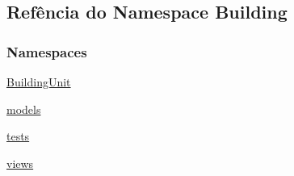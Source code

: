 \hypertarget{namespaceBuilding}{}\subsection{Refência do Namespace Building}
\label{namespaceBuilding}
\subsubsection*{Namespaces}
\begin{DoxyCompactItemize}
\item 
 \hyperlink{namespaceBuilding_1_1BuildingUnit}{Building\+Unit}
\item 
 \hyperlink{namespaceBuilding_1_1models}{models}
\item 
 \hyperlink{namespaceBuilding_1_1tests}{tests}
\item 
 \hyperlink{namespaceBuilding_1_1views}{views}
\end{DoxyCompactItemize}
